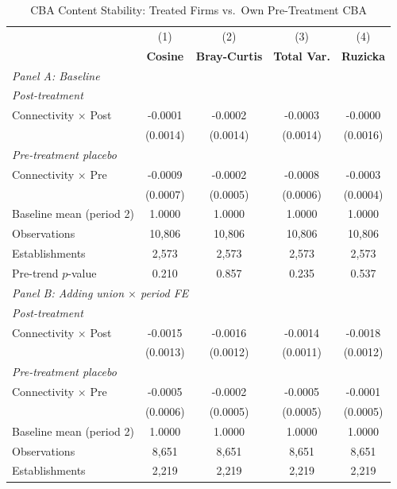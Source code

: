 \begin{table}[H]
\centering
\caption{CBA Content Stability: Treated Firms vs.\ Own Pre-Treatment CBA}
\label{tab:treated_self_cba_similarity}
\scriptsize
\setlength{\tabcolsep}{8pt}
\begin{tabular}{lcccc}
\toprule\toprule
 & (1) & (2) & (3) & (4) \\
 & \textbf{Cosine} & \textbf{Bray-Curtis} & \textbf{Total Var.} & \textbf{Ruzicka} \\
\midrule
\multicolumn{5}{l}{\textit{Panel A: Baseline}} \\
\multicolumn{5}{l}{\textit{Post-treatment}} \\
Connectivity $\times$ Post & -0.0001 & -0.0002 & -0.0003 & -0.0000 \\
 & (0.0014) & (0.0014) & (0.0014) & (0.0016) \\
\multicolumn{5}{l}{\textit{Pre-treatment placebo}} \\
Connectivity $\times$ Pre & -0.0009 & -0.0002 & -0.0008 & -0.0003 \\
 & (0.0007) & (0.0005) & (0.0006) & (0.0004) \\
\midrule
Baseline mean (period 2) & 1.0000 & 1.0000 & 1.0000 & 1.0000 \\
Observations &       10,806 &       10,806 &       10,806 &       10,806 \\
Establishments &        2,573 &        2,573 &        2,573 &        2,573 \\
Pre-trend $p$-value & 0.210 & 0.857 & 0.235 & 0.537 \\
\midrule
\multicolumn{5}{l}{\textit{Panel B: Adding union $\times$ period FE}} \\
\multicolumn{5}{l}{\textit{Post-treatment}} \\
Connectivity $\times$ Post & -0.0015 & -0.0016 & -0.0014 & -0.0018 \\
 & (0.0013) & (0.0012) & (0.0011) & (0.0012) \\
\multicolumn{5}{l}{\textit{Pre-treatment placebo}} \\
Connectivity $\times$ Pre & -0.0005 & -0.0002 & -0.0005 & -0.0001 \\
 & (0.0006) & (0.0005) & (0.0005) & (0.0005) \\
\midrule
Baseline mean (period 2) & 1.0000 & 1.0000 & 1.0000 & 1.0000 \\
Observations &        8,651 &        8,651 &        8,651 &        8,651 \\
Establishments &        2,219 &        2,219 &        2,219 &        2,219 \\

\end{tabular}
\end{table}
